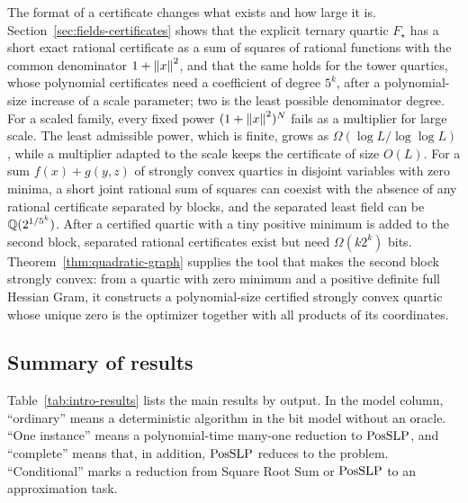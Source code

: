 The format of a certificate changes what exists and how large it is.
Section~\ref{sec:fields-certificates} shows that the explicit ternary quartic
$F_\star$ has a short exact rational certificate as a sum of squares of
rational functions with the common denominator $1+\left\lVert x\right\rVert^2$, and that the
same holds for the tower quartics, whose polynomial certificates need a
coefficient of degree $5^k$, after a polynomial-size increase of a scale
parameter; two is the least possible denominator degree. For a scaled family,
every fixed power $(1+\left\lVert x\right\rVert^2)^N$ fails as a multiplier for large scale.
The least admissible power, which is finite, grows as
$\Omega(\log L/\log\log L)$, while a multiplier adapted to the scale keeps the
certificate of size $O(L)$. For a sum $f(x)+g(y,z)$ of strongly convex
quartics in disjoint variables with zero minima, a short joint rational sum of
squares can coexist with the absence of any rational certificate separated by
blocks, and the separated least field can be $\mathbb Q(2^{1/5^k})$. After a
certified quartic with a tiny positive minimum is added to the second block,
separated rational certificates exist but need $\Omega(k2^k)$ bits.
Theorem~\ref{thm:quadratic-graph} supplies the tool that makes the second
block strongly convex: from a quartic with zero minimum and a positive
definite full Hessian Gram, it constructs a polynomial-size certified strongly
convex quartic whose unique zero is the optimizer together with all products
of its coordinates.

\subsection{Summary of results}
\label{sec:intro-summary}

Table~\ref{tab:intro-results} lists the main results by output. In the model
column, ``ordinary'' means a deterministic algorithm in the bit model without
an oracle. ``One instance'' means a polynomial-time many-one reduction to
$\mathrm{PosSLP}$, and ``complete'' means that, in addition, $\mathrm{PosSLP}$ reduces to the
problem. ``Conditional'' marks a reduction from Square Root Sum or $\mathrm{PosSLP}$
to an approximation task.


